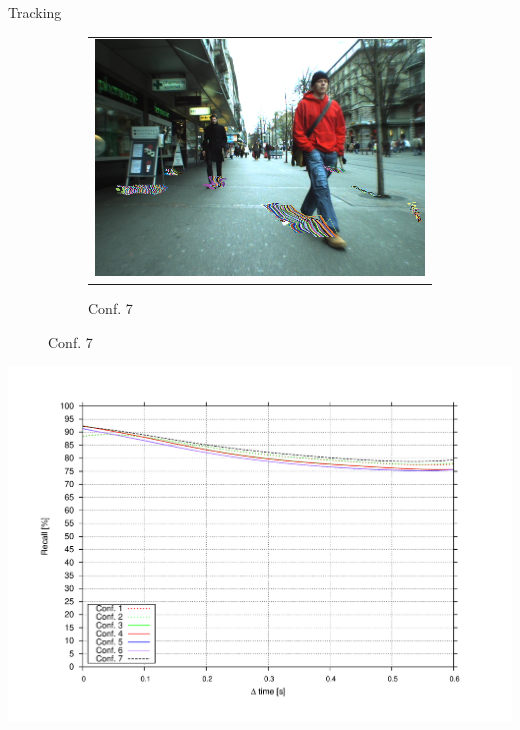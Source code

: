 \begin{frame}[plain]{Tracking}
\begin{center}
{\begin{figure}
        \begin{subfigure}[b]{0.45\textwidth}
	  \begin{tabular}{c}
	    \includegraphics[width=\textwidth]{trackingConf7}
	  \end{tabular}
	  \caption*{Conf. 7}
        \end{subfigure}%
      \end{figure}
    }
     {
      \begin{overlayarea}{\textwidth}{\textheight}
	\begin{center}
	  \includegraphics[height=1.1\textheight,trim=50 40 80 60,clip]{recall_vs_step}
	\end{center}
      \end{overlayarea}
      \begin{overlayarea}{\textwidth}{\textheight}

\end{overlayarea}}
\end{center}
\end{frame}
